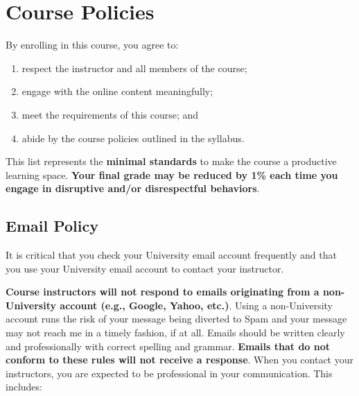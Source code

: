 \documentclass[
  letterpaper,
]{article}
\providecommand{\tightlist}{%
  \setlength{\itemsep}{0pt}\setlength{\parskip}{0pt}}\usepackage{longtable,booktabs,array}
\begin{document}
\section{Course Policies}\label{sec-policies}

By enrolling in this course, you agree to:

\begin{enumerate}
\def\labelenumi{\arabic{enumi}.}
\tightlist
\item
  respect the instructor and all members of the course;
\item
  engage with the online content meaningfully;
\item
  meet the requirements of this course; and
\item
  abide by the course policies outlined in the syllabus.
\end{enumerate}

This list represents the \textbf{minimal standards} to make the course a
productive learning space. \textbf{Your final grade may be reduced by
1\% each time you engage in disruptive and/or disrespectful behaviors}.

\subsection{Email Policy}\label{email-policy}

\begin{tcolorbox}[enhanced jigsaw, breakable, coltitle=black, opacityback=0, rightrule=.15mm, colframe=quarto-callout-note-color-frame, bottomtitle=1mm, opacitybacktitle=0.6, bottomrule=.15mm, left=2mm, toptitle=1mm, titlerule=0mm, title=\textcolor{quarto-callout-note-color}{\faInfo}\hspace{0.5em}{Note}, colback=white, arc=.35mm, toprule=.15mm, leftrule=.75mm, colbacktitle=quarto-callout-note-color!10!white]

It is critical that you check your University email account frequently
and that you use your University email account to contact your
instructor.

\end{tcolorbox}

\textbf{Course instructors will not respond to emails originating from a
non-University account (e.g., Google, Yahoo, etc.)}. Using a
non-University account runs the risk of your message being diverted to
Spam and your message may not reach me in a timely fashion, if at all.
Emails should be written clearly and professionally with correct
spelling and grammar. \textbf{Emails that do not conform to these rules
will not receive a response}. When you contact your instructors, you are
expected to be professional in your communication. This includes:
\end{document}
